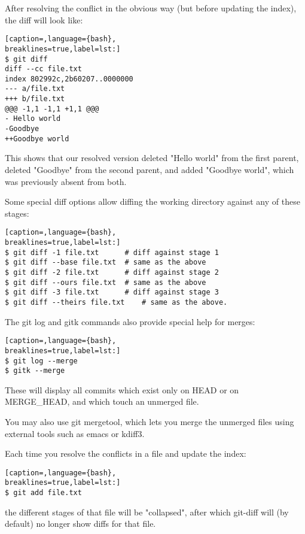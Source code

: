 After resolving the conflict in the obvious way (but before updating the
index), the diff will look like:
\lstset{basicstyle=\scriptsize, numbers=none, captionpos=b, tabsize=4}
\begin{lstlisting}[caption=,language={bash},
breaklines=true,label=lst:]
$ git diff
diff --cc file.txt
index 802992c,2b60207..0000000
--- a/file.txt
+++ b/file.txt
@@@ -1,1 -1,1 +1,1 @@@
- Hello world
-Goodbye
++Goodbye world
\end{lstlisting}

This shows that our resolved version deleted "Hello world" from the first
parent, deleted "Goodbye" from the second parent, and added "Goodbye world",
which was previously absent from both.

Some special diff options allow diffing the working directory against any of
these stages:
\lstset{basicstyle=\scriptsize, numbers=none, captionpos=b, tabsize=4}
\begin{lstlisting}[caption=,language={bash},
breaklines=true,label=lst:]
$ git diff -1 file.txt      # diff against stage 1
$ git diff --base file.txt  # same as the above
$ git diff -2 file.txt      # diff against stage 2
$ git diff --ours file.txt  # same as the above
$ git diff -3 file.txt      # diff against stage 3
$ git diff --theirs file.txt    # same as the above.
\end{lstlisting}

The git log and gitk commands also provide special help for merges:
\lstset{basicstyle=\scriptsize, numbers=none, captionpos=b, tabsize=4}
\begin{lstlisting}[caption=,language={bash},
breaklines=true,label=lst:]
$ git log --merge
$ gitk --merge
\end{lstlisting}

These will display all commits which exist only on HEAD or on MERGE\_HEAD, and
which touch an unmerged file.

You may also use git mergetool, which lets you merge the unmerged files using
external tools such as emacs or kdiff3.

Each time you resolve the conflicts in a file and update the index:
\lstset{basicstyle=\scriptsize, numbers=none, captionpos=b, tabsize=4}
\begin{lstlisting}[caption=,language={bash},
breaklines=true,label=lst:]
$ git add file.txt
\end{lstlisting}

the different stages of that file will be "collapsed", after which git-diff
will (by default) no longer show diffs for that file.

